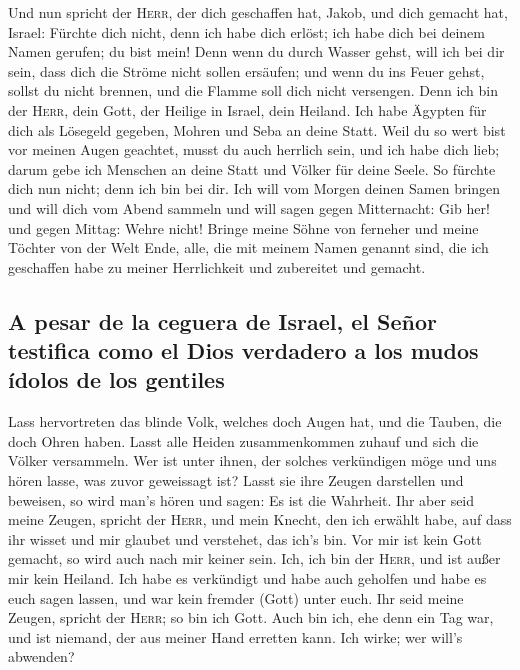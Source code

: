  Und nun spricht der \textsc{Herr}, der dich geschaffen
hat, Jakob, und dich gemacht hat, Israel: Fürchte dich nicht, denn ich
habe dich erlöst; ich habe dich bei deinem Namen gerufen; du bist mein!
 Denn wenn du durch Wasser gehst, will ich bei dir sein,
dass dich die Ströme nicht sollen ersäufen; und wenn du ins Feuer gehst,
sollst du nicht brennen, und die Flamme soll dich nicht versengen.
 Denn ich bin der \textsc{Herr}, dein Gott, der Heilige in
Israel, dein Heiland. Ich habe Ägypten für dich als Lösegeld gegeben,
Mohren und Seba an deine Statt.  Weil du so wert bist vor
meinen Augen geachtet, musst du auch herrlich sein, und ich habe dich
lieb; darum gebe ich Menschen an deine Statt und Völker für deine Seele.
 So fürchte dich nun nicht; denn ich bin bei dir. Ich will
vom Morgen deinen Samen bringen und will dich vom Abend sammeln
 und will sagen gegen Mitternacht: Gib her! und gegen
Mittag: Wehre nicht! Bringe meine Söhne von ferneher und meine Töchter
von der Welt Ende,  alle, die mit meinem Namen genannt
sind, die ich geschaffen habe zu meiner Herrlichkeit und zubereitet und
gemacht.

\hypertarget{a-pesar-de-la-ceguera-de-israel-el-seuxf1or-testifica-como-el-dios-verdadero-a-los-mudos-uxeddolos-de-los-gentiles}{%
\subsection{A pesar de la ceguera de Israel, el Señor testifica como el
Dios verdadero a los mudos ídolos de los
gentiles}\label{a-pesar-de-la-ceguera-de-israel-el-seuxf1or-testifica-como-el-dios-verdadero-a-los-mudos-uxeddolos-de-los-gentiles}}

 Lass hervortreten das blinde Volk, welches doch Augen
hat, und die Tauben, die doch Ohren haben.  Lasst alle
Heiden zusammenkommen zuhauf und sich die Völker versammeln. Wer ist
unter ihnen, der solches verkündigen möge und uns hören lasse, was zuvor
geweissagt ist? Lasst sie ihre Zeugen darstellen und beweisen, so wird
man's hören und sagen: Es ist die Wahrheit.  Ihr aber
seid meine Zeugen, spricht der \textsc{Herr}, und mein Knecht, den ich
erwählt habe, auf dass ihr wisset und mir glaubet und verstehet, das
ich's bin. Vor mir ist kein Gott gemacht, so wird auch nach mir keiner
sein.  Ich, ich bin der \textsc{Herr}, und ist außer mir
kein Heiland.  Ich habe es verkündigt und habe auch
geholfen und habe es euch sagen lassen, und war kein fremder (Gott)
unter euch. Ihr seid meine Zeugen, spricht der \textsc{Herr}; so bin ich
Gott.  Auch bin ich, ehe denn ein Tag war, und ist
niemand, der aus meiner Hand erretten kann. Ich wirke; wer will's
abwenden?

